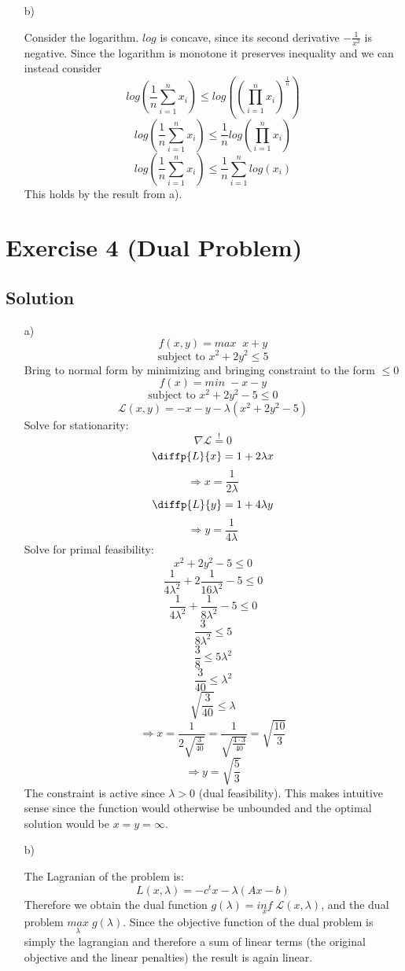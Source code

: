 \documentclass[10pt]{article}
\numberwithin{equation}{section}
\begin{document}
\begin{enumerate}
{}
\item[b)]{
    Consider the logarithm. $log$ is concave, since its second derivative $-\frac{1}{x^2}$ is negative.
    Since the logarithm is monotone it preserves inequality and we can instead consider
    $$log(\frac{1}{n} \sum_{i=1}^{n}x_i) \leq log((\prod_{i=1}^n x_i)^{\frac{1}{n}})$$
    $$log(\frac{1}{n} \sum_{i=1}^{n}x_i) \leq \frac{1}{n} log(\prod_{i=1}^n x_i)$$
    $$log(\frac{1}{n} \sum_{i=1}^{n}x_i) \leq \frac{1}{n} \sum_{i=1}^n log(x_i)$$
    This holds by the result from a).

}
\end{enumerate}

\section*{Exercise 4 (Dual Problem)}
\subsection*{Solution}
\begin{enumerate}
\item[a)]{
    $$ f(x, y) = max\;\; x+y$$
    $$\text{subject to } x^2 +2y^2 \leq 5$$
    Bring to normal form by minimizing and bringing constraint to the form $\leq 0$
    $$ f(x) = min\;  -x-y$$
    $$\text{subject to } x^2 + 2y^2 - 5 \leq 0$$
    $$\mathcal{L}(x,y) = -x-y - \lambda (x^2 + 2y^2 -5)$$
    Solve for stationarity: 
    $$\nabla \mathcal{L} \overset{!}{=} 0$$
    $$\diffp{L}{x} = 1 + 2\lambda x$$
    $$\Rightarrow x  = \frac{1}{2\lambda}$$
    $$\diffp{L}{y} = 1 + 4\lambda y$$
    $$\Rightarrow y  = \frac{1}{4\lambda}$$
    Solve for primal feasibility:
    $$x^2 + 2y^2 -5 \leq 0$$
    $$\frac{1}{4\lambda^2} + 2\frac{1}{16\lambda^2} -5 \leq 0$$
    $$\frac{1}{4\lambda^2} + \frac{1}{8\lambda^2} -5 \leq 0$$
    $$\frac{3}{8\lambda^2}  \leq 5$$
    $$\frac{3}{8}  \leq 5\lambda^2$$
    $$\frac{3}{40}  \leq \lambda^2$$
    $$\sqrt{\frac{3}{40}} \leq \lambda$$
    $$\Rightarrow x = \frac{1}{2\sqrt{\frac{3}{40}}} = \frac{1}{\sqrt{\frac{4  \cdot 3}{40}}}= \sqrt{\frac{10}{3}}$$
    $$ \Rightarrow y = \sqrt{\frac{5}{3}}$$
    The constraint is active since $\lambda > 0$ (dual feasibility).
    This makes intuitive sense since the function would otherwise be unbounded and the optimal solution would be $x = y = \infty$.
}
\item[b)]{
    The Lagranian of the problem is:
    $$L(x,\lambda) =-c^t x - \lambda (Ax-b)$$
    Therefore we obtain the dual function $g(\lambda) = \underset{x}{inf}\; \mathcal{L}(x,\lambda)$, and the dual problem $\underset{\lambda}{max}\; g(\lambda)$.
    Since the objective function of the dual problem is simply the lagrangian and therefore a sum of linear terms (the original objective and the linear penalties) the result is again linear.

    

}
\end{enumerate}
\end{document}
